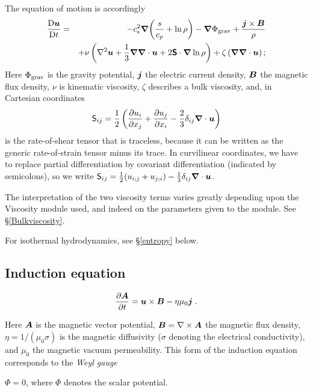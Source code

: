 \documentclass[\mydriver,12pt,twoside,notitlepage,a4paper]{article}
\makeatletter
\newcommand{\name}[2][]{%
  \def\index@{#1}%
  \textsl{#2\/}%
  \ifx\index@\@empty\index{#2@\MakeUppercase #2}%
  \else\index{#1}%
  \fi%
}
\newcommand{\De}      {\mathrm{D}}
\renewcommand{\vec}[1]{\mbox{\boldmath{$#1$}}}
\newcommand{\grad}    {\vec{\nabla}}
\newcommand{\Div}     {\vec{\nabla}\cdot}
\newcommand{\curl}    {\nabla\times}
\newcommand{\Laplace} {\nabla^2}
\newcommand{\Av}            {\vec{A}}
\newcommand{\Bv}            {\vec{B}}
\newcommand{\jv}            {\vec{j}}
\newcommand{\uv}            {\vec{u}}
\newcommand{\cs}            {c_{\rm s}}
\newcommand{\Strain}        {\boldsymbol{\mathsf{S}}}
\makeatother
\begin{document}
The equation of motion is accordingly
\begin{eqnarray}
  \frac{\De\uv}{\De t}
   =& &-\cs^2\grad\biggl(\frac{s}{c_p} + \ln\rho\biggr)
      - \grad\Phi_{\rm grav}
      + \frac{\jv\times\Bv}{\rho}  \nonumber \\
    & &+ \nu \left( \Laplace\uv + \frac{1}{3}\grad\Div\uv
      + 2\Strain\cdot\grad\ln\rho\right) + \zeta\left(\grad\Div\uv\right);
\label{DuDt}
\end{eqnarray}
Here $\Phi_{\rm grav}$ is the gravity potential,
$\jv$ the electric current density, $\Bv$
the magnetic flux density, $\nu$ is kinematic viscosity, $\zeta$ describes a bulk
viscosity, and, in Cartesian coordinates
\begin{equation} \label{Eq-S-traceless}
  {\mathsf S}_{ij} = \frac{1}{2}\left({\partial u_i\over\partial x_j}
                 + {\partial u_j\over\partial x_i}
                 -\frac{2}{3} \delta_{ij}\Div\uv\right)
\end{equation}
is the rate-of-shear tensor that is traceless, because it can be written as
the generic rate-of-strain tensor minus its trace.
In curvilinear coordinates, we have to replace partial differentiation
by covariant differentiation (indicated by semicolons), so we write
${\mathsf S}_{ij}=\frac{1}{2}(u_{i;j}+u_{j;i})-\frac{1}{3}\delta_{ij}\Div\uv$.

The interpretation of the two viscosity terms varies greatly depending upon
the Viscosity module used, and indeed on the parameters given to the module.
See \S\ref{Bulkviscosity}.

For isothermal hydrodynamics, see \S\ref{entropy} below.


\subsection{Induction equation}

\begin{equation}
  \frac{\partial\Av}{\partial t}
  = \uv\times\Bv - \eta\mu_0\jv \; .
\label{dAdt}
\end{equation}

Here $\Av$ is the magnetic vector potential,
$\Bv = \curl\Av$ the magnetic
flux density, $\eta = 1/(\mu_0\sigma)$ is the magnetic diffusivity
($\sigma$ denoting the electrical conductivity), and $\mu_0$ the
magnetic vacuum permeability.
This form of the induction equation corresponds to the \name{Weyl gauge}
$\Phi=0$, where $\Phi$ denotes the scalar potential.
\end{document}
